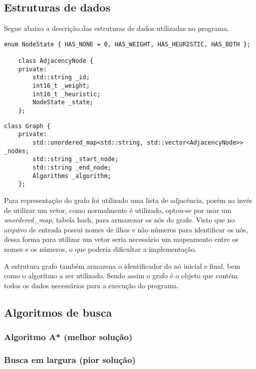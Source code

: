 \documentclass[12pt, a4paper]{article}
\begin{document}
\subsection{Estruturas de dados}\label{sec:estruturas}
Segue abaixo a descrição das estruturas de dados utilizadas no programa.

\begin{lstlisting}[caption={Estrutura de dados para representar um nó do grafo.}, label={lst:node}]
    enum NodeState { HAS_NONE = 0, HAS_WEIGHT, HAS_HEURISTIC, HAS_BOTH };

    class AdjacencyNode {
    private:
        std::string _id;
        int16_t _weight;
        int16_t _heuristic;
        NodeState _state;
    };
\end{lstlisting}

\begin{lstlisting}[caption={Estrutura de dados para representar o grafo.}, label={lst:graph}]
    class Graph {
    private:
        std::unordered_map<std::string, std::vector<AdjacencyNode>> _nodes;
        std::string _start_node;
        std::string _end_node;
        Algorithms _algorithm;
    };
\end{lstlisting}

Para representação do grafo foi utilizado uma lista de adjacência,
porém ao invés de utilizar um vetor, como normalmente é utilizado,
optou-se por usar um \textit{unordered\_map}, tabela hash, para armazenar os nós do grafo.
Visto que no arquivo de entrada possui nomes de ilhas e não números para identificar os nós,
dessa forma para utilizar um vetor seria necessário um mapeamento entre os nomes e os números,
o que poderia dificultar a implementação.

A estrutura grafo também armazena o identificador do nó inicial e final,
bem como o algoritmo a ser utilizado.
Sendo assim o grafo é o objeto que contém todos os dados necessários para a execução do programa.

\subsection{Algoritmos de busca}\label{sec:algoritmos}
\subsubsection{Algoritmo A* (melhor solução)}\label{sec:astar}
\subsubsection{Busca em largura (pior solução)}\label{sec:bl}
\end{document}

